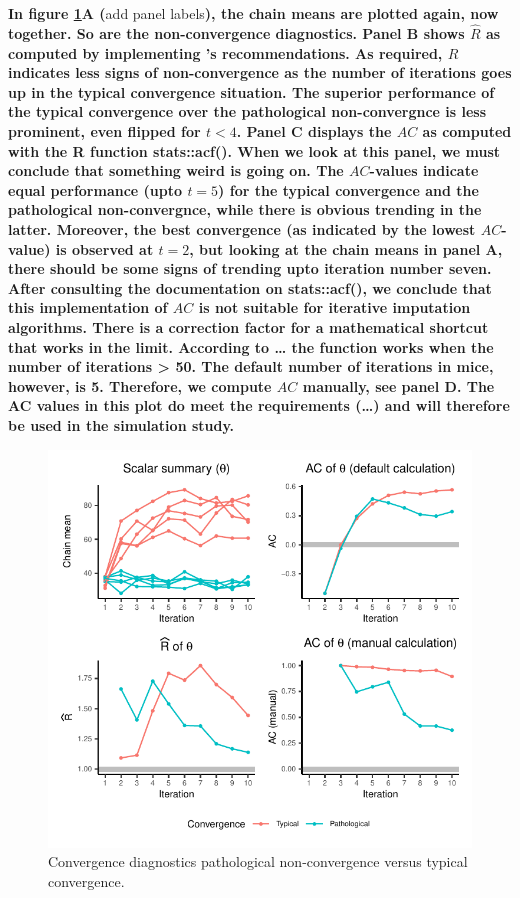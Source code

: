 \documentclass[Royal,times,sageh]{sagej}
\begin{document}
\textbf{In figure \ref{fig:diagnostics}A (}add panel labels\textbf{),
the chain means are plotted again, now together. So are the
non-convergence diagnostics. Panel B shows \(\widehat{R}\) as computed
by implementing \citet{veht19} 's recommendations. As required,
\(\widehat{R}\) indicates less signs of non-convergence as the number of
iterations goes up in the typical convergence situation. The superior
performance of the typical convergence over the pathological
non-convergnce is less prominent, even flipped for \(t<4\). Panel C
displays the \(AC\) as computed with the R function stats::acf(). When
we look at this panel, we must conclude that something weird is going
on. The \(AC\)-values indicate equal performance (upto \(t=5\)) for the
typical convergence and the pathological non-convergnce, while there is
obvious trending in the latter. Moreover, the best convergence (as
indicated by the lowest \(AC\)-value) is observed at \(t=2\), but
looking at the chain means in panel A, there should be some signs of
trending upto iteration number seven. After consulting the documentation
on stats::acf(), we conclude that this implementation of \(AC\) is not
suitable for iterative imputation algorithms. There is a correction
factor for a mathematical shortcut that works in the limit. According to
\ldots{} the function works when the number of iterations \textgreater{}
50. The default number of iterations in mice, however, is 5. Therefore,
we compute \(AC\) manually, see panel D. The AC values in this plot do
meet the requirements (\ldots) and will therefore be used in the
simulation study.}

\begin{figure}

{\centering \includegraphics{manuscript_files/figure-latex/diagnostics-1} 

}

\caption{Convergence diagnostics pathological non-convergence versus typical convergence.}\label{fig:diagnostics}
\end{figure}
\end{document}
